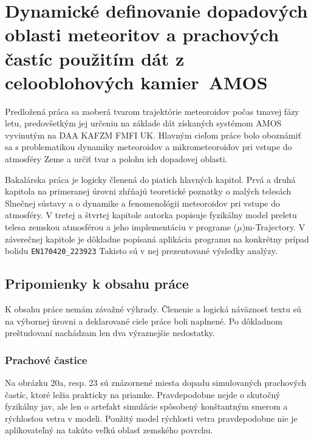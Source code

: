 \hypertarget{dynamickuxe9-definovanie-dopadovuxfdch-oblasti-meteoritov-a-prachovuxfdch-ux10dastuxedc-pouux17eituxedm-duxe1t-z-celooblohovuxfdch-kamieramos}{%
\section{Dynamické definovanie dopadových oblasti meteoritov a
prachových častíc použitím dát z celooblohových
kamier~AMOS}\label{dynamickuxe9-definovanie-dopadovuxfdch-oblasti-meteoritov-a-prachovuxfdch-ux10dastuxedc-pouux17eituxedm-duxe1t-z-celooblohovuxfdch-kamieramos}}

Predložená práca sa zaoberá tvarom trajektórie meteoroidov počas tmavej
fázy letu, predovšetkým jej určeniu na základe dát získaných systémom
AMOS vyvinutým na DAA KAFZM FMFI UK. Hlavným cieľom práce bolo oboznámiť
sa s problematikou dynamiky meteoroidov a mikrometeoroidov pri vstupe do
atmosféry Zeme a určiť tvar a polohu ich dopadovej oblasti.

Bakalárska práca je logicky členená do piatich hlavných kapitol. Prvá a
druhá kapitola na primeranej úrovni zhŕňajú teoretické poznatky o malých
telesách Slnečnej sústavy a o dynamike a fenomenológii meteoroidov pri
vstupe do atmosféry. V tretej a štvrtej kapitole autorka popisuje
fyzikálny model preletu telesa zemskou atmosférou a jeho implementáciu v
programe (\(\mu\))m-Trajectory. V záverečnej kapitole je dôkladne
popísaná aplikácia programu na konkrétny prípad bolidu
\texttt{EN170420\_223923} Takisto sú v nej prezentované výsledky
analýzy.

\hypertarget{pripomienky-k-obsahu-pruxe1ce}{%
\subsection{Pripomienky k obsahu
práce}\label{pripomienky-k-obsahu-pruxe1ce}}

K obsahu práce nemám závažné výhrady. Členenie a logická náväznosť textu
sú na výbornej úrovni a deklarované ciele práce boli naplnené. Po
dôkladnom preštudovaní nachádzam len dva výraznejšie nedostatky.

\hypertarget{prachovuxe9-ux10dastice}{%
\subsubsection{Prachové častice}\label{prachovuxe9-ux10dastice}}

Na obrázku 20a, resp. 23 sú znázornené miesta dopadu simulovaných
prachových častíc, ktoré ležia prakticky na priamke. Pravdepodobne nejde
o skutočný fyzikálny jav, ale len o artefakt simulácie spôsobený
konštantným smerom a rýchlosťou vetra v modeli. Použitý model rýchlosti
vetra pravdepodobne nie je aplikovateľný na takúto veľkú oblasť zemského
povrchu.

